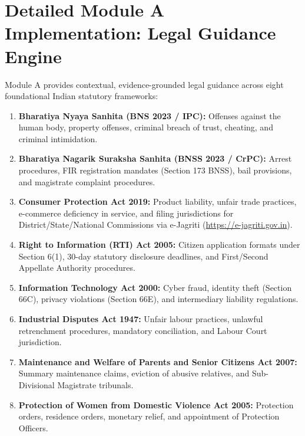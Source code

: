\section{Detailed Module A Implementation: Legal Guidance Engine}
\label{sec:module_a_impl}
Module A provides contextual, evidence-grounded legal guidance across eight foundational Indian statutory frameworks:
\begin{enumerate}
    \item \textbf{Bharatiya Nyaya Sanhita (BNS 2023 / IPC):} Offenses against the human body, property offenses, criminal breach of trust, cheating, and criminal intimidation.
    \item \textbf{Bharatiya Nagarik Suraksha Sanhita (BNSS 2023 / CrPC):} Arrest procedures, FIR registration mandates (Section 173 BNSS), bail provisions, and magistrate complaint procedures.
    \item \textbf{Consumer Protection Act 2019:} Product liability, unfair trade practices, e-commerce deficiency in service, and filing jurisdictions for District/State/National Commissions via e-Jagriti (\url{https://e-jagriti.gov.in}).
    \item \textbf{Right to Information (RTI) Act 2005:} Citizen application formats under Section 6(1), 30-day statutory disclosure deadlines, and First/Second Appellate Authority procedures.
    \item \textbf{Information Technology Act 2000:} Cyber fraud, identity theft (Section 66C), privacy violations (Section 66E), and intermediary liability regulations.
    \item \textbf{Industrial Disputes Act 1947:} Unfair labour practices, unlawful retrenchment procedures, mandatory conciliation, and Labour Court jurisdiction.
    \item \textbf{Maintenance and Welfare of Parents and Senior Citizens Act 2007:} Summary maintenance claims, eviction of abusive relatives, and Sub-Divisional Magistrate tribunals.
    \item \textbf{Protection of Women from Domestic Violence Act 2005:} Protection orders, residence orders, monetary relief, and appointment of Protection Officers.
\end{enumerate}

